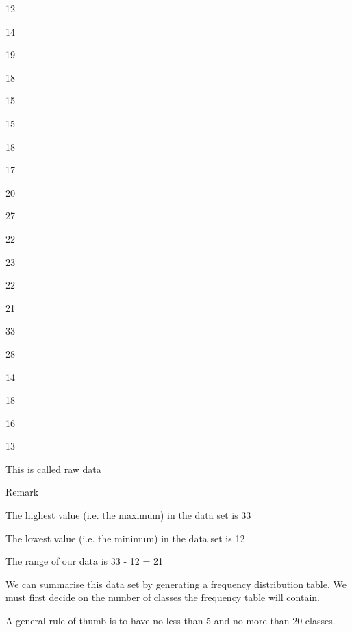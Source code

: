  

















12
 

14
 

19
 

18
 

15
 

15
 

18
 

17
 

20
 

 27
 



22
 

23
 

22
 

21
 

33
 

28
 

14
 

18
 

16
 

 13
 

 

This is called raw data


Remark

The highest value (i.e. the maximum)  in the data set is 33

 

The lowest value (i.e. the minimum) in the data set is 12

 

The range of our data is 33 - 12 = 21

 
 


 


We can summarise this data set by generating a frequency distribution table. We must first decide on the number of classes the frequency table will contain.

 

A general rule of thumb is to have no less than 5 and no more than 20 classes.

